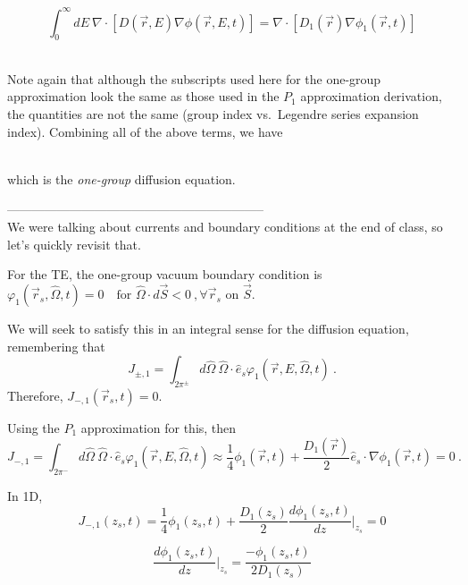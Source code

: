 \documentclass[12pt]{article}
\newif\ifeqns
\newcommand{\rvec}{\ensuremath{\vec{r}}}
\newcommand{\omvec}{\ensuremath{\hat{\Omega}}}
\begin{document}
\begin{equation*}
\int_0^{\infty}dE\:\nabla\cdot[D(\rvec,E)\nabla\phi(\rvec,E,t)]=\nabla\cdot[D_1(\rvec)\nabla\phi_1(\rvec,t)]
\end{equation*}
\else
\vspace*{25em}\\
\fi

Note again that although the subscripts used here for the one-group approximation look the same as those used in
the $P_1$ approximation derivation, the quantities are not the same (group index vs.\ Legendre series expansion index). Combining all of the above terms, we
have
\ifeqns
\begin{equation*}
\frac{1}{v_1}\frac{\partial \phi_1(\rvec,t)}{\partial t} = S_1(\rvec,t) - 
\Sigma_{a,1}(\rvec)\phi_1(\rvec,t) + \nabla\cdot[D_1(\rvec)\nabla\phi_1(\rvec,t)]\:,
\end{equation*}
\else
\vspace*{4em}\\
\fi
which is the \emph{one-group} diffusion equation.

--------------------------------------------------------------\\
We were talking about currents and boundary conditions at the end of class, so let's quickly revisit that. 

For the TE, the one-group vacuum boundary condition is $\varphi_1 (\vec{r}_s, \omvec, t) = 0 \quad \text{for }\omvec \cdot d\vec{S} < 0\:, \forall \rvec_s \text{ on } \vec{S}$.

We will seek to satisfy this in an integral sense for the diffusion equation, remembering that
\begin{equation*}
J_{\pm,1} = \int_{2\pi^{\pm}}d\omvec\:\omvec\cdot\hat{e}_s\varphi_1(\rvec,E,\omvec,t)\:.
\end{equation*}
Therefore, $J_{-,1}(\rvec_s,t) = 0$.

Using the $P_1$ approximation for this, then
\[J_{-,1} = \int_{2\pi^{-}}d\omvec\:\omvec\cdot\hat{e}_s\varphi_1(\rvec,E,\omvec,t) \approx \frac{1}{4}\phi_1(\rvec, t) + \frac{D_1(\rvec)}{2}\hat{e}_s \cdot \nabla \phi_1(\rvec, t) = 0\:.\]


In 1D,
\begin{equation*}
J_{-,1}(z_s,t) = \frac{1}{4}\phi_1(z_s,t) + \frac{D_1(z_s)}{2}\frac{d\phi_1(z_s,t)}{dz}\Bigr|_{z_s} = 0
\end{equation*}

\begin{equation*}
\frac{d\phi_1(z_s,t)}{dz}\Bigr|_{z_s} = \frac{-\phi_1(z_s,t)}{2D_1(z_s)}
\end{equation*}
\end{document}
